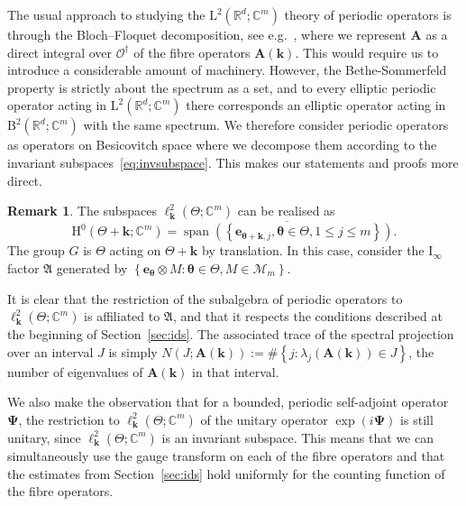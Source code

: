 \documentclass[10pt]{amsart}
\theoremstyle{definition}\newtheorem{defi}[theo]{Definition}\newtheorem{rema}[theo]{Remark}\newtheorem{exam}[theo]{Example}\newtheorem{nota}[theo]{Notation}
\DeclareMathOperator{\spann}{span}
\newcommand{\RB}{\mathrm{B}}
\newcommand{\RH}{\mathrm{H}}
\newcommand{\RL}{\mathrm{L}}
\newcommand{\rmI}{\mathrm{I}}
\newcommand{\R}{\mathbb R}
\newcommand{\C}{\mathbb C}
\newcommand{\CM}{\mathcal{M}}
\newcommand{\CO}{\mathcal{O}}
\newcommand{\BPsi}{\boldsymbol \Psi}
\newcommand{\btheta}{\boldsymbol \theta}
\newcommand{\BA}{\mathbf A}
\newcommand{\be}{\mathbf e}
\newcommand{\bk}{\mathbf k}
\newcommand{\FA}{\mathfrak A}
\newcommand{\set}[1]{\left\{ #1 \right\}}
\begin{document}
The usual approach to studying the $\RL^2(\R^d;\C^m)$ theory of periodic operators is through the Bloch--Floquet decomposition, see e.g.~\cite{Kuchment}, where we represent $\BA$ as a direct integral over $\CO^\dagger$ of the fibre operators $\BA(\bk)$. This would require us to introduce a considerable amount of machinery. However, the Bethe-Sommerfeld property is strictly about the spectrum as a set, and to every elliptic periodic operator acting in $\RL^2(\R^d;\C^m)$ there corresponds an elliptic operator acting in $\RB^2(\R^d;\C^m)$ with the same spectrum. We therefore consider periodic operators as operators on Besicovitch space where we decompose them according to the invariant subspaces~\eqref{eq:invsubspace}. This makes our statements and proofs more direct.
\begin{rema}\label{rem:Iinfinitybs}
The subspaces $\ell^2_\bk(\Theta;\C^m)$ can be realised as
\[
\RH^0(\Theta + \bk;\C^m) = \overline{\spann\left(\left\{\be_{\btheta + \bk,j},
\btheta \in \Theta, 1 \le j \le m\right\}\right)}.
\]
The group $G$ is $\Theta$ acting on
$\Theta + \bk$ by translation. In this case, consider the $\rmI_\infty$ factor $\FA$ generated by $
\set{\be_{\btheta} \otimes M: \btheta \in \Theta, M \in \CM_m}. $

It is clear that the restriction of the subalgebra of periodic operators to $\ell^2_\bk(\Theta;\C^m)$ is affiliated to $\FA$, and that it respects the conditions described at the beginning of Section~\ref{sec:ids}. The associated trace of the spectral projection over an interval $J$ is simply $N(J;\BA(\bk)) := \#\set{j : \lambda_j(\BA(\bk)) \in J}$, the number of eigenvalues of $\BA(\bk)$ in that interval.

We also make the observation that for a bounded, periodic self-adjoint operator~$\BPsi$, the restriction to $\ell^2_\bk(\Theta;\C^m)$ of the unitary operator $\exp(i \BPsi)$ is still unitary, since $\ell^2_\bk(\Theta;\C^m)$ is an invariant subspace. This means that we can simultaneously use the gauge transform on each of the fibre operators and that the estimates from Section~\ref{sec:ids} hold uniformly for the counting function of the fibre operators.
\end{rema}
\end{document}
